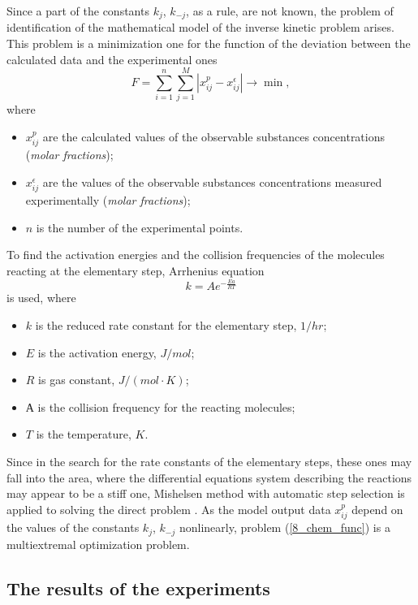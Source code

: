 Since a part of the constants $k_j$, $k_{-j}$, as a rule, are not known, the problem of identification of the mathematical model of  the inverse kinetic problem arises. This problem is a minimization one for the function of the deviation between the calculated data and the experimental ones
\begin{equation} \label{8_chem_func}
F=\sum_{i=1}^n{\sum_{j=1}^M{\left|x_{ij}^p-x_{ij}^{\epsilon}\right|}}\rightarrow \min,
\end{equation}
where
\begin{itemize}
	\item $x_{ij}^p$ are the calculated values of the observable substances concentrations  (\textit{molar fractions});	
	\item $x_{ij}^{\epsilon}$ are the values of the observable substances concentrations measured experimentally (\textit{molar fractions});
	\item $n$ is the number of the experimental points.
\end{itemize}

To find the activation energies and the collision frequencies of the molecules reacting at the elementary step, Arrhenius equation
\[
k=Ae^{-\frac{Ea}{RT}}
\]
is used, where
\begin{itemize}
	\item $k$ is the reduced rate constant for the elementary step, $1/hr$;	
	\item $E$ is the activation energy, $J/{mol}$;
	\item $R$ is gas constant, $J/{(mol \cdot K)}$;
	\item $А$ is the collision frequency for the reacting molecules;
	\item $T$ is the temperature, $K$.	
\end{itemize}

Since in the search for the rate constants of the elementary steps, these ones may fall into the area, where the differential equations system describing the reactions may appear to be a stiff one, Mishelsen method with automatic step selection is applied to solving the direct problem \cite{8_Gubaidullin2010}. As the model output data $x_{ij}^p$ depend on the values of the constants $k_j$, $k_{-j}$ nonlinearly, problem (\ref{8_chem_func}) is a multiextremal optimization problem.

\subsection{The results of the experiments}

